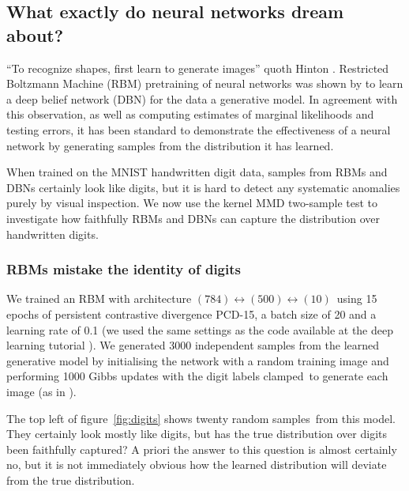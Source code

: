 \subsection{What exactly do neural networks dream about?}

``To recognize shapes, first learn to generate images'' quoth Hinton \citep{Hinton2007-eo}.
Restricted Boltzmann Machine (RBM) pretraining of neural networks was shown by \cite{Hinton2006-yw} to learn a deep belief network (DBN) for the data \ie a generative model.
In agreement with this observation, as well as computing estimates of marginal likelihoods and testing errors, it has been standard to demonstrate the effectiveness of a neural network by generating samples from the distribution it has learned.

When trained on the MNIST handwritten digit data, samples from RBMs and DBNs certainly look like digits, but it is hard to detect any systematic anomalies purely by visual inspection.
We now use the kernel MMD two-sample test to investigate how faithfully RBMs and DBNs can capture the distribution over handwritten digits.

\subsubsection{RBMs mistake the identity of digits}

We trained an RBM with architecture $(784)\leftrightarrow(500)\leftrightarrow(10)$\footnotemark~using 15 epochs of persistent contrastive divergence PCD-15, a batch size of 20 and a learning rate of 0.1 (\ie we used the same settings as the code available at the deep learning tutorial \citep{deep-learning-tutorial}).
We generated 3000 independent samples from the learned generative model by initialising the network with a random training image and performing 1000 Gibbs updates with the digit labels clamped\footnotemark~to generate each image (as in \eg \cite{Hinton2007-eo}).

The top left of figure~\ref{fig:digits} shows twenty random samples\footnotemark~from this model.
They certainly look mostly like digits, but has the true distribution over digits been faithfully captured?
A priori the answer to this question is almost certainly no, but it is not immediately obvious how the learned distribution will deviate from the true distribution.

